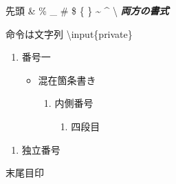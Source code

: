 \leavevmode{}\newline
先頭 \& \% \_ \# \$ \{ \} \textasciitilde{} \textasciicircum{} \textbackslash{}\newline
\textit{\textbf{両方の書式}}\par
\leavevmode{}\par
\leavevmode{}命令は文字列 \textbackslash{}\allowbreak{}i\allowbreak{}n\allowbreak{}p\allowbreak{}u\allowbreak{}t\allowbreak{}\{\allowbreak{}p\allowbreak{}r\allowbreak{}i\allowbreak{}v\allowbreak{}a\allowbreak{}t\allowbreak{}e\allowbreak{}\}\allowbreak{}%
\par
\begin{enumerate}
\renewcommand{\labelenumi}{\arabic{enumi}.}
\setcounter{enumi}{1}
\item \leavevmode{}番号一\par
\begin{itemize}
\item \leavevmode{}混在箇条書き\par
\begin{enumerate}
\renewcommand{\labelenumii}{\arabic{enumii}.}
\setcounter{enumii}{6}
\item \leavevmode{}内側番号\par
\begin{enumerate}
\renewcommand{\labelenumiii}{\arabic{enumiii}.}
\setcounter{enumiii}{8}
\item \leavevmode{}四段目\par
\end{enumerate}
\end{enumerate}
\end{itemize}
\end{enumerate}
\begin{enumerate}
\renewcommand{\labelenumi}{\arabic{enumi}.}
\setcounter{enumi}{4}
\item \leavevmode{}独立番号\par
\end{enumerate}
\leavevmode{}末尾目印\par
